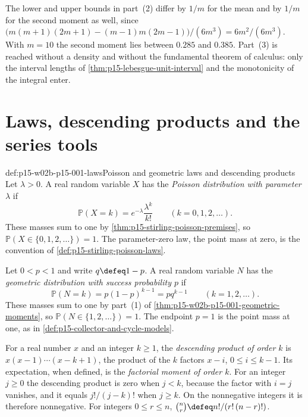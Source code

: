 The lower and upper bounds in part~(2) differ by \(1/m\) for the mean and
by \(1/m\) for the second moment as well, since
\(\bigl(m(m+1)(2m+1)-(m-1)m(2m-1)\bigr)/(6m^3)=6m^2/(6m^3)\). With
\(m=10\) the second moment lies between \(0.285\) and \(0.385\).
Part~(3) is reached without a density and without the fundamental
theorem of calculus: only the interval lengths of
\cref{thm:p15-lebesgue-unit-interval} and the monotonicity of the
integral enter.

\section{Laws, descending products and the series tools}
\label{sec:p15-w02b-p15-001-laws}

\begin{hbdefinition}{def:p15-w02b-p15-001-laws}{Poisson and geometric laws and descending products}
Let \(\lambda>0\). A real random variable \(X\) has the \emph{Poisson
distribution with parameter \(\lambda\)} if
\[
 \mathbb P(X=k)=e^{-\lambda}\frac{\lambda^k}{k!}
 \qquad(k=0,1,2,\ldots).
\]
These masses sum to one by \cref{thm:p15-stirling-poisson-premises},
so \(\mathbb P(X\in\{0,1,2,\ldots\})=1\). The parameter-zero law, the
point mass at zero, is the convention of
\cref{def:p15-stirling-poisson-laws}.

Let \(0<p<1\) and write \(q\defeq1-p\). A real random variable \(N\)
has the \emph{geometric distribution with success probability \(p\)} if
\[
 \mathbb P(N=k)=p(1-p)^{k-1}=pq^{k-1}\qquad(k=1,2,\ldots).
\]
These masses sum to one by part~(1) of
\cref{thm:p15-w02b-p15-001-geometric-moments}, so
\(\mathbb P(N\in\{1,2,\ldots\})=1\). The endpoint \(p=1\) is the point
mass at one, as in \cref{def:p15-collector-and-cycle-models}.

For a real number \(x\) and an integer \(k\geq1\), the
\emph{descending product of order \(k\)} is
\(x(x-1)\cdots(x-k+1)\), the product of the \(k\) factors \(x-i\),
\(0\leq i\leq k-1\). Its expectation, when defined, is the
\emph{factorial moment of order \(k\)}. For an integer \(j\geq0\) the
descending product is zero when \(j<k\), because the factor with
\(i=j\) vanishes, and it equals \(j!/(j-k)!\) when \(j\geq k\). On the
nonnegative integers it is therefore nonnegative.
For integers \(0\leq r\leq n\),
\(\binom nr\defeq n!/(r!\,(n-r)!)\).
\end{hbdefinition}

